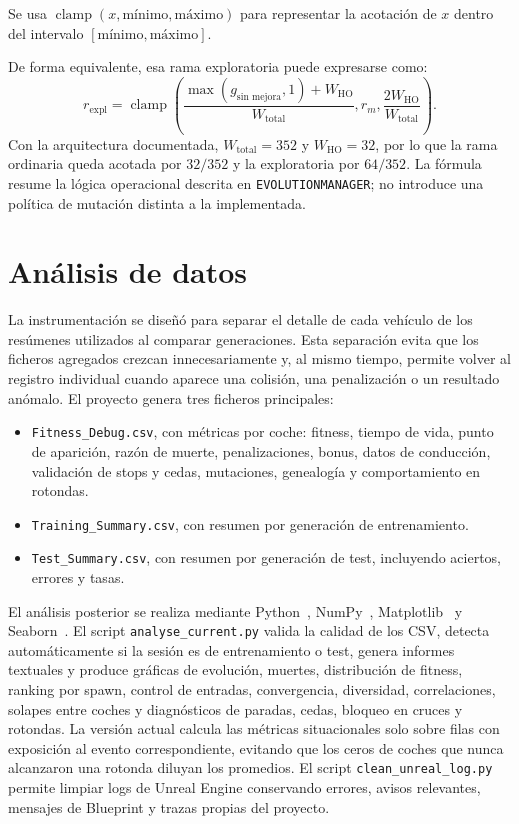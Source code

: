 Se usa \(\operatorname{clamp}(x,\text{mínimo},\text{máximo})\) para representar la acotación de \(x\) dentro del intervalo \([\text{mínimo},\text{máximo}]\).

De forma equivalente, esa rama exploratoria puede expresarse como:
\begin{equation}
r_{\text{expl}}=\operatorname{clamp}\left(
\frac{\max(g_{\text{sin mejora}},1)+W_{\text{HO}}}{W_{\text{total}}},
r_m,
\frac{2W_{\text{HO}}}{W_{\text{total}}}
\right).
\end{equation}
Con la arquitectura documentada, \(W_{\text{total}}=352\) y \(W_{\text{HO}}=32\), por lo que la rama ordinaria queda acotada por \(32/352\) y la exploratoria por \(64/352\). La fórmula resume la lógica operacional descrita en \texttt{EVOLUTIONMANAGER}; no introduce una política de mutación distinta a la implementada.

\section{Análisis de datos}

La instrumentación se diseñó para separar el detalle de cada vehículo de los resúmenes utilizados al comparar generaciones. Esta separación evita que los ficheros agregados crezcan innecesariamente y, al mismo tiempo, permite volver al registro individual cuando aparece una colisión, una penalización o un resultado anómalo. El proyecto genera tres ficheros principales:

\begin{itemize}[leftmargin=*]
  \item \texttt{Fitness\_Debug.csv}, con métricas por coche: fitness, tiempo de vida, punto de aparición, razón de muerte, penalizaciones, bonus, datos de conducción, validación de stops y cedas, mutaciones, genealogía y comportamiento en rotondas.
  \item \texttt{Training\_Summary.csv}, con resumen por generación de entrenamiento.
  \item \texttt{Test\_Summary.csv}, con resumen por generación de test, incluyendo aciertos, errores y tasas.
\end{itemize}

El análisis posterior se realiza mediante Python~\cite{python}, NumPy~\cite{numpy}, Matplotlib~\cite{matplotlib} y Seaborn~\cite{seaborn}. El script \texttt{analyse\_current.py} valida la calidad de los CSV, detecta automáticamente si la sesión es de entrenamiento o test, genera informes textuales y produce gráficas de evolución, muertes, distribución de fitness, ranking por spawn, control de entradas, convergencia, diversidad, correlaciones, solapes entre coches y diagnósticos de paradas, cedas, bloqueo en cruces y rotondas. La versión actual calcula las métricas situacionales solo sobre filas con exposición al evento correspondiente, evitando que los ceros de coches que nunca alcanzaron una rotonda diluyan los promedios. El script \texttt{clean\_unreal\_log.py} permite limpiar logs de Unreal Engine conservando errores, avisos relevantes, mensajes de Blueprint y trazas propias del proyecto.

